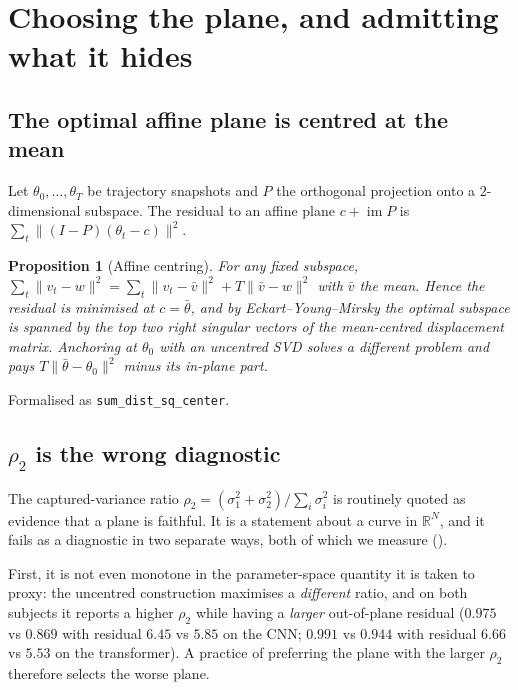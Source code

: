 \documentclass[11pt]{article}
\newtheorem{proposition}[theorem]{Proposition}
\theoremstyle{definition}
\newcommand{\R}{\mathbb{R}}
\newcommand{\lean}[1]{\texttt{#1}}
\begin{document}
\section{Choosing the plane, and admitting what it hides}
\label{sec:plane}

\subsection{The optimal affine plane is centred at the mean}

Let $\theta_0,\dots,\theta_T$ be trajectory snapshots and $P$ the orthogonal projection
onto a $2$-dimensional subspace. The residual to an affine plane $c+\operatorname{im}P$
is $\sum_t\|(I-P)(\theta_t-c)\|^2$.

\begin{proposition}[Affine centring]
\label{prop:affine}
For any fixed subspace, $\sum_t\|v_t-w\|^2=\sum_t\|v_t-\bar v\|^2+T\|\bar v-w\|^2$ with
$\bar v$ the mean. Hence the residual is minimised at $c=\bar\theta$, and by
Eckart--Young--Mirsky \citep{eckart1936approximation,mirsky1960symmetric} the optimal
subspace is spanned by the top two right singular vectors of the \emph{mean-centred}
displacement matrix. Anchoring at $\theta_0$ with an uncentred SVD solves a different
problem and pays $T\|\bar\theta-\theta_0\|^2$ minus its in-plane part.
\end{proposition}

Formalised as \lean{sum\_dist\_sq\_center}.

\subsection{\texorpdfstring{$\rho_2$}{rho\_2} is the wrong diagnostic}

The captured-variance ratio $\rho_2=(\sigma_1^2+\sigma_2^2)/\sum_i\sigma_i^2$ is
routinely quoted as evidence that a plane is faithful. It is a statement about a curve
in $\R^N$, and it fails as a diagnostic in two separate ways, both of which we measure
().

First, it is not even monotone in the parameter-space quantity it is taken to proxy: the
uncentred construction maximises a \emph{different} ratio, and on both subjects it
reports a higher $\rho_2$ while having a \emph{larger} out-of-plane residual
($0.975$ vs $0.869$ with residual $6.45$ vs $5.85$ on the CNN; $0.991$ vs $0.944$ with
residual $6.66$ vs $5.53$ on the transformer). A practice of preferring the plane with
the larger $\rho_2$ therefore selects the worse plane.
\end{document}
